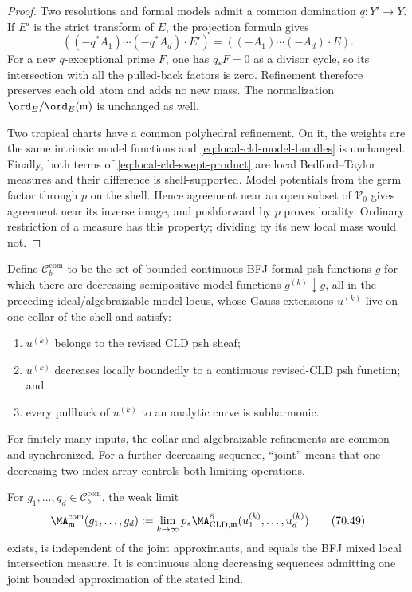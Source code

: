 \begin{proof}
Two resolutions and formal models admit a common domination
\(q:Y'\to Y\). If \(E'\) is the strict transform of \(E\), the projection
formula gives
\[
 ((-q^*A_1)\cdots(-q^*A_d)\cdot E')
 =((-A_1)\cdots(-A_d)\cdot E).
\]
For a new \(q\)-exceptional prime \(F\), one has \(q_*F=0\) as a divisor
cycle, so its intersection with all the pulled-back factors is zero.
Refinement therefore preserves each old atom and adds no new mass. The
normalization \(\ord_E/\ord_E(\mathfrak m)\) is unchanged as well.

Two tropical charts have a common polyhedral refinement. On it, the weights
are the same intrinsic model functions and
\eqref{eq:local-cld-model-bundles} is unchanged. Finally, both terms of
\eqref{eq:local-cld-swept-product} are local Bedford--Taylor measures and
their difference is shell-supported. Model potentials from the germ factor
through \(p\) on the shell. Hence agreement near an open subset of
\(\mathcal V_0\) gives agreement near its inverse image, and pushforward by
\(p\) proves locality. Ordinary restriction of a measure has this property;
dividing by its new local mass would not.
\end{proof}

Define \(\mathcal C_b^{\mathrm{com}}\) to be the set of bounded continuous
BFJ formal psh functions \(g\) for which there are decreasing semipositive
model functions \(g^{(k)}\downarrow g\), all in the preceding
ideal/algebraizable model locus, whose Gauss extensions \(u^{(k)}\) live on
one collar of the shell and satisfy:
\begin{enumerate}
\item \(u^{(k)}\) belongs to the revised CLD psh sheaf;
\item \(u^{(k)}\) decreases locally boundedly to a continuous revised-CLD
      psh function; and
\item every pullback of \(u^{(k)}\) to an analytic curve is subharmonic.
\end{enumerate}
For finitely many inputs, the collar and algebraizable refinements are
common and synchronized. For a further decreasing sequence, ``joint'' means
that one decreasing two-index array controls both limiting operations.

\begin{proposition}\label{prop:local-cld-bounded-closure}
For \(g_1,\ldots,g_d\in\mathcal C_b^{\mathrm{com}}\), the weak limit
\[
 \MA^{\mathrm{com}}_{\mathfrak m}(g_1,\ldots,g_d)
 :=\lim_{k\to\infty}
 p_*\MA^{\partial}_{\mathrm{CLD},\mathfrak m}
       (u_1^{(k)},\ldots,u_d^{(k)})
\tag{70.49}\label{eq:local-cld-bounded-limit}
\]
exists, is independent of the joint approximants, and equals the BFJ mixed
local intersection measure. It is continuous along decreasing sequences
admitting one joint bounded approximation of the stated kind.
\end{proposition}

